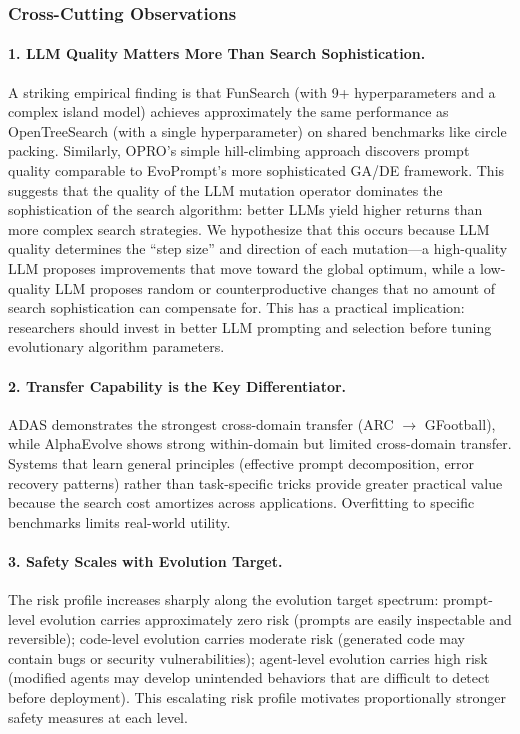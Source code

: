 \subsubsection{Cross-Cutting Observations}

\paragraph{1. LLM Quality Matters More Than Search Sophistication.}
A striking empirical finding is that FunSearch (with 9+ hyperparameters and a complex island model) achieves approximately the same performance as OpenTreeSearch (with a single hyperparameter) on shared benchmarks like circle packing. Similarly, OPRO's simple hill-climbing approach discovers prompt quality comparable to EvoPrompt's more sophisticated GA/DE framework. This suggests that the quality of the LLM mutation operator dominates the sophistication of the search algorithm: better LLMs yield higher returns than more complex search strategies. We hypothesize that this occurs because LLM quality determines the ``step size'' and direction of each mutation---a high-quality LLM proposes improvements that move toward the global optimum, while a low-quality LLM proposes random or counterproductive changes that no amount of search sophistication can compensate for. This has a practical implication: researchers should invest in better LLM prompting and selection before tuning evolutionary algorithm parameters.

\paragraph{2. Transfer Capability is the Key Differentiator.}
ADAS demonstrates the strongest cross-domain transfer (ARC $\rightarrow$ GFootball), while AlphaEvolve shows strong within-domain but limited cross-domain transfer. Systems that learn general principles (effective prompt decomposition, error recovery patterns) rather than task-specific tricks provide greater practical value because the search cost amortizes across applications. Overfitting to specific benchmarks limits real-world utility.

\paragraph{3. Safety Scales with Evolution Target.}
The risk profile increases sharply along the evolution target spectrum: prompt-level evolution carries approximately zero risk (prompts are easily inspectable and reversible); code-level evolution carries moderate risk (generated code may contain bugs or security vulnerabilities); agent-level evolution carries high risk (modified agents may develop unintended behaviors that are difficult to detect before deployment). This escalating risk profile motivates proportionally stronger safety measures at each level.

